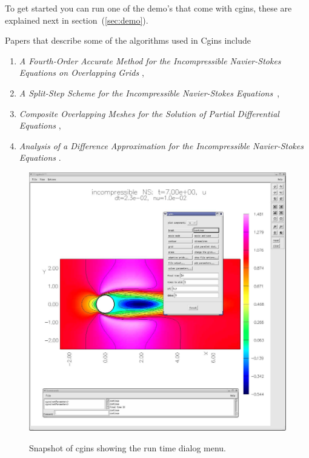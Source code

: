 \documentclass{article}
\newcommand{\Index}[1]{#1\index{#1}}
\begin{document}
To get started you can run one of the demo's that come with cgins, these are 
explained next in section~(\ref{sec:demo}).

Papers that describe some of the \Index{algorithms} used in Cgins include
\begin{enumerate}
  \item {\sl A Fourth-Order Accurate Method for the Incompressible
            {N}avier-{S}tokes Equations on Overlapping Grids} \cite{ICNS},
  \item {\em A Split-Step Scheme for the Incompressible {Navier-Stokes} Equations}~\cite{splitStep2003},
  \item {\sl Composite Overlapping Meshes for the Solution of Partial Differential Equations}
        \cite{CGNS},
  \item {\sl Analysis of a Difference Approximation for the Incompressible
            Navier-Stokes Equations} \cite{INSDIV}.
         
\end{enumerate}

  
\begin{figure}[hbt]
\begin{center}
  \includegraphics[width=.75\linewidth]{cginsScreen} \\
  \caption{Snapshot of cgins showing the run time dialog menu. }
  \end{center} 
  \label{fig:runTimeScreen}
\end{figure}

\clearpage
\end{document}
